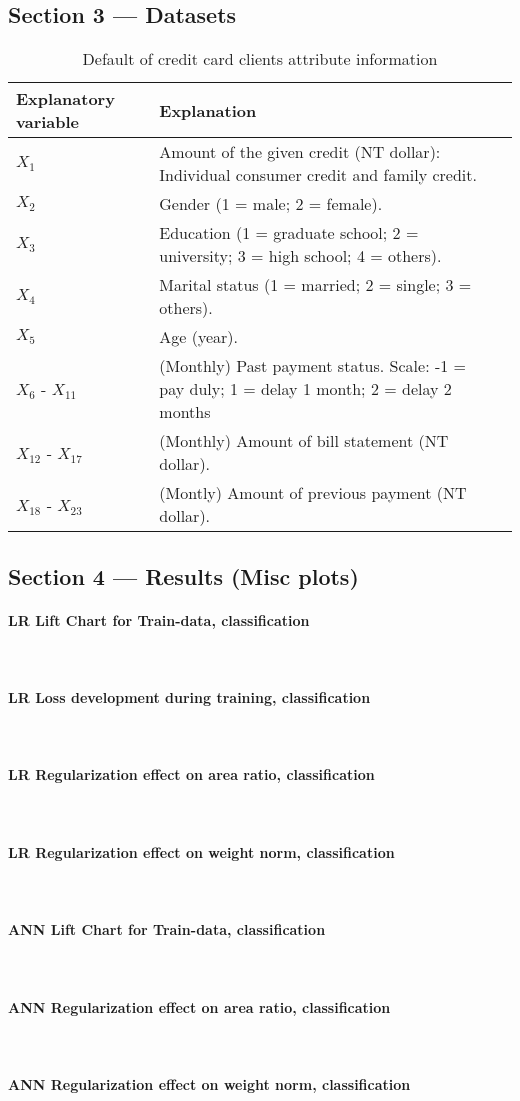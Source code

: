 \documentclass[10pt, a4paper, twocolumn]{article}
\newcommand{\myparagraph}[1]{\paragraph{#1}\mbox{}\\}
\begin{document}
	\subsection{Section 3 --- Datasets}
	\begin{table} [H]
		\caption{Default of credit card clients attribute information}
			\begin{tabular}{@{}lll@{}} %
				\toprule
				Explanatory variable & Explanation \\ \midrule
				$X_1$ & Amount of the given credit (NT dollar): Individual consumer credit and family credit.\\
				$X_2$ & Gender (1 = male; 2 = female). \\
				$X_3$ & Education (1 = graduate school; 2 = university; 3 = high school; 4 = others).\\
				$X_4$ & Marital status (1 = married; 2 = single; 3 = others).\\
				$X_5$ & Age (year).\\				
				$X_6$ - $X_{11}$ & (Monthly) Past payment status. Scale: -1 = pay duly; 1 = delay 1 month; 2 = delay 2 months\\
				$X_{12}$ - $X_{17}$ & (Monthly) Amount of bill statement (NT dollar).\\
				$X_{18}$ - $X_{23}$ & (Montly) Amount of previous payment (NT dollar).\\ \bottomrule
		\end{tabular}%
	\end{table}	
\twocolumn
	\subsection{Section 4 --- Results (Misc plots)}
		\myparagraph{LR Lift Chart for Train-data, classification}
		\myparagraph{LR Loss development during training, classification}
		\myparagraph{LR Regularization effect on area ratio, classification}
		\myparagraph{LR Regularization effect on weight norm, classification}
		
		\myparagraph{ANN Lift Chart for Train-data, classification}

		\myparagraph{ANN Regularization effect on area ratio, classification}
		\myparagraph{ANN Regularization effect on weight norm, classification}
	
\nocite{*}


\end{document}
